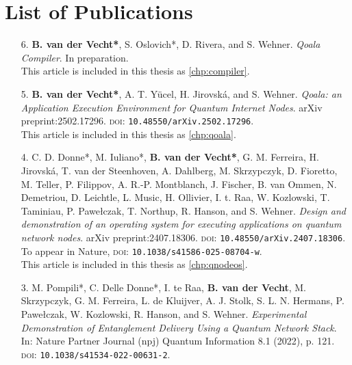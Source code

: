 \chapter*{List of Publications}

\def\aicon{\makebox[1.25em][l]{\footnotesize \faUser}}
\def\ficon{\makebox[1.25em][l]{\footnotesize \faFileTextO}}
\def\picon{\makebox[1.25em][l]{\footnotesize \faPencilSquareO}}

\begin{enumerate}[label={\arabic*.},itemsep=0.7\baselineskip,parsep=0.3\baselineskip]
    \item[6.] \textbf{B. van der Vecht*}, S. Oslovich*, D. Rivera, and S. Wehner. \textit{Qoala Compiler}. In preparation.
        \\ \ficon This article is included in this thesis as \cref{chp:compiler}.

    \item[5.]
        \textbf{B. van der Vecht*}, A. T. Yücel, H. Jirovská, and S. Wehner.
        \textit{Qoala: an Application Execution Environment for Quantum Internet Nodes}.
        arXiv preprint:2502.17296.
        {\small \textsc{doi:}} \texttt{10.48550/arXiv.2502.17296}.
        \\ \ficon This article is included in this thesis as \cref{chp:qoala}.

    \item[4.]
        C. D. Donne*, M. Iuliano*, \textbf{B. van der Vecht*}, G. M. Ferreira, H. Jirovská, T. van der Steenhoven, A. Dahlberg, M. Skrzypczyk, D. Fioretto, M. Teller, P. Filippov, A. R.-P. Montblanch, J. Fischer, B. van Ommen, N. Demetriou, D. Leichtle, L. Music, H. Ollivier, I. t. Raa, W. Kozlowski, T. Taminiau, P. Pawełczak, T. Northup, R. Hanson, and S. Wehner.
        \textit{Design and demonstration of an operating system for executing applications on quantum network nodes}.
        arXiv preprint:2407.18306.
        {\small \textsc{doi:}} \texttt{10.48550/arXiv.2407.18306}.
        To appear in Nature,
        {\small \textsc{doi:}} \texttt{10.1038/s41586-025-08704-w}.
        \\ \ficon This article is included in this thesis as \cref{chp:qnodeos}.

    \item[3.]
        M. Pompili*, C. Delle Donne*, I. te Raa, \textbf{B. van der Vecht}, M. Skrzypczyk, G. M. Ferreira, L. de Kluijver, A. J. Stolk, S. L. N. Hermans, P. Pawełczak, W. Kozlowski, R. Hanson, and S. Wehner.
        \textit{Experimental Demonstration of Entanglement Delivery Using a Quantum Network Stack}.
        In: Nature Partner Journal (npj) Quantum Information 8.1 (2022), p. 121.
        {\small \textsc{doi:}} \texttt{10.1038/s41534-022-00631-2}.


\end{enumerate}
